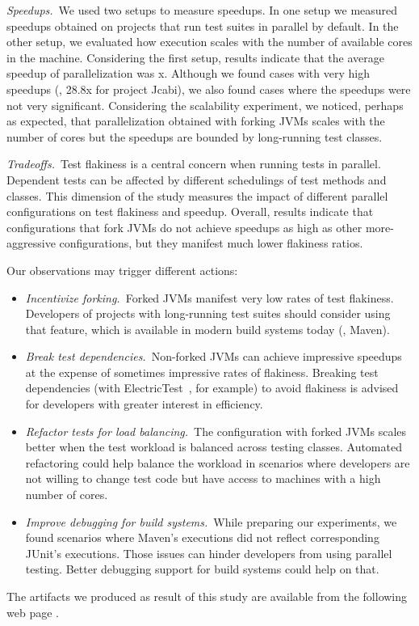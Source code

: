 \noindent\emph{Speedups.}~We used two setups to measure speedups.  In one setup
we measured speedups obtained on projects that run test suites in parallel by
default.  In the other setup, we evaluated how execution scales with the number
of available cores in the machine.  Considering the first
setup, results indicate that the average speedup of parallelization was
\avgSpeedup{}x.  Although we found cases with very high speedups (\eg{}, 28.8x
for project Jcabi), we also found cases where the speedups were not very
significant.  Considering the scalability experiment, we noticed, perhaps as
expected, that parallelization obtained with forking JVMs scales with the number
of cores but the speedups are bounded by long-running test classes.

\noindent\emph{Tradeoffs.}~Test flakiness is a central concern when running
tests in parallel.  Dependent tests can be affected by different schedulings of
test methods and classes.  This dimension of the study measures the impact of
different parallel configurations on test flakiness and speedup.  Overall,
results indicate that configurations that fork JVMs do not achieve speedups as
high as other more-aggressive configurations, but they manifest much lower
flakiness ratios.

Our observations may trigger different actions:

\begin{itemize}
\item \emph{Incentivize forking.}~Forked JVMs manifest very low rates
  of test flakiness.  Developers of projects with long-running test
  suites should consider using that feature, which is available in
  modern build systems today (\eg{}, Maven).
\item \emph{Break test dependencies.}~Non-forked JVMs can achieve
  impressive speedups at the expense of sometimes impressive rates of
  flakiness.  Breaking test dependencies (with
  ElectricTest~\cite{bell-etal-esecfse2015}, for example) to avoid flakiness is advised for developers with
  greater interest in efficiency.
\item \emph{Refactor tests for load balancing.}~The configuration with
  forked JVMs scales
  better when the test workload is balanced
  across testing classes.  Automated refactoring could help balance
  the workload in scenarios where developers are not willing to change
  test code but have access to machines with a high number of cores.
\item \emph{Improve debugging for build systems.}~While preparing our
  experiments, we found scenarios where Maven's executions did not reflect
  corresponding JUnit's executions. Those issues can hinder developers from using parallel
  testing. Better debugging support for build systems could help
  on that. 
\end{itemize}

The artifacts we produced as result of this study are available from
the following web page \webpage{}.